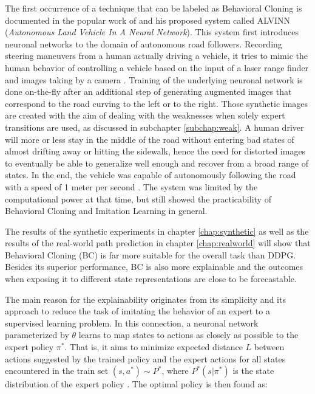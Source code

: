 The first occurrence of a technique that can be labeled as Behavioral Cloning is documented in the popular work of \cite{alvinn} and his proposed system called ALVINN (\textit{Autonomous Land
Vehicle In A Neural Network}). This system first introduces neuronal networks to the domain of autonomous road followers. Recording steering maneuvers from a human actually driving a vehicle, it tries to mimic the human behavior of controlling a vehicle based on the input of a laser range finder and images taking by a camera \cite[p.~2]{alvinn}. Training of the underlying neuronal network is done on-the-fly after an additional step of generating augmented images that correspond to the road curving to the left or to the right. Those synthetic images are created with the aim of dealing with the weaknesses when solely expert transitions are used, as discussed in subchapter \ref{subchap:weak}. A human driver will more or less stay in the middle of the road without entering bad states of almost drifting away or hitting the sidewalk, hence the need for distorted images to eventually be able to generalize well enough and recover from a broad range of states. In the end, the vehicle was capable of autonomously following the road with a speed of 1 meter per second \cite[p.~7]{alvinn}. The system was limited by the computational power at that time, but still showed the practicability of Behavioral Cloning and Imitation Learning in general.
\par
The results of the synthetic experiments in chapter \ref{chap:synthetic} as well as the results of the real-world path prediction in chapter \ref{chap:realworld} will show that Behavioral Cloning (BC) is far more suitable for the overall task than DDPG. Besides its superior performance, BC is also more explainable and the outcomes when exposing it to different state representations are close to be forecastable. 
\par
The main reason for the explainability originates from its simplicity and its approach to reduce the task of imitating the behavior of an expert to a supervised learning problem. In this connection, a neuronal network parameterized by $\theta$ learns to map states to actions as closely as possible to the expert policy $\pi^*$. That is, it aims to minimize expected distance $L$ between actions suggested by the trained policy and the expert actions for all states encountered in the train set $(s, a^*) \sim P^*$, where $P^*(s|\pi^*)$ is the state distribution of the expert policy \cite[]{le2022survey}. The optimal policy is then found as:

